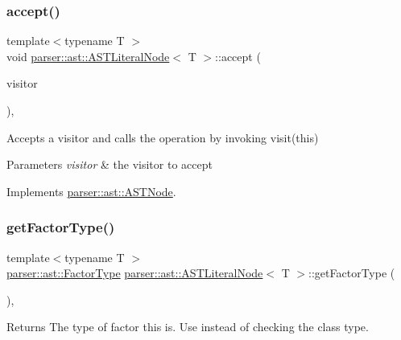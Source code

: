 \subsubsection{\texorpdfstring{accept()}{accept()}}
{\footnotesize\ttfamily template$<$typename T $>$ \\
void \hyperlink{classparser_1_1ast_1_1ASTLiteralNode}{parser\+::ast\+::\+A\+S\+T\+Literal\+Node}$<$ T $>$\+::accept (\begin{DoxyParamCaption}\item[{\hyperlink{classvisitor_1_1Visitor}{visitor\+::\+Visitor} $\ast$}]{visitor }\end{DoxyParamCaption})\hspace{0.3cm}{\ttfamily [override]}, {\ttfamily [virtual]}}

Accepts a visitor and calls the operation by invoking {\ttfamily visit(this)} 
\begin{DoxyParams}{Parameters}
{\em visitor} & the visitor to accept \\
\hline
\end{DoxyParams}


Implements \hyperlink{classparser_1_1ast_1_1ASTNode_a3ff84fdfdbbc5c39b70b4d04c22e7dc3}{parser\+::ast\+::\+A\+S\+T\+Node}.

\mbox{\label{classparser_1_1ast_1_1ASTLiteralNode_a08efdbff5f7b0a0b7623ad964a6e4a9f}} 
\subsubsection{\texorpdfstring{get\+Factor\+Type()}{getFactorType()}}
{\footnotesize\ttfamily template$<$typename T $>$ \\
\hyperlink{ASTFactorNode_8h_afbe2fcc03ef15b74a0c1ed1cda7ab0e8}{parser\+::ast\+::\+Factor\+Type} \hyperlink{classparser_1_1ast_1_1ASTLiteralNode}{parser\+::ast\+::\+A\+S\+T\+Literal\+Node}$<$ T $>$\+::get\+Factor\+Type (\begin{DoxyParamCaption}{ }\end{DoxyParamCaption})\hspace{0.3cm}{\ttfamily [override]}, {\ttfamily [virtual]}}

\begin{DoxyReturn}{Returns}
The type of factor this is. Use instead of checking the class type. 
\end{DoxyReturn}


